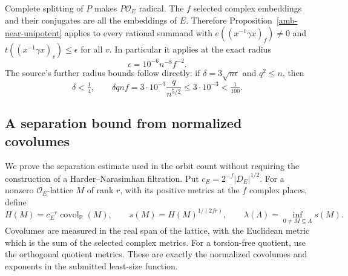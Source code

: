 Complete splitting of $P$ makes $P\mathcal O_E$ radical. The
$f$ selected complex embeddings and their conjugates are all the
embeddings of $E$. Therefore Proposition~\ref{amb-near-unipotent}
applies to every rational summand with
$e((x^{-1}\gamma x)_f)\ne0$ and
$t((x^{-1}\gamma x)_v)\le\epsilon$ for all $v$.
In particular it applies at the exact radius
\begin{equation}\label{amb-small-radius}
                  \epsilon=10^{-6}n^{-8}f^{-2}.
\end{equation}
The source's further radius bounds follow directly: if
$\delta=3\sqrt{n\epsilon}$ and $q^2\le n$, then
\[
             \delta<\tfrac14,
             \qquad\delta qnf
               =3\cdot10^{-3}\frac q{n^{5/2}}
               \le3\cdot10^{-3}<\tfrac1{100}.
\]

\subsection{A separation bound from normalized covolumes}

We prove the separation estimate used in the orbit count without
requiring the construction of a Harder--Narasimhan filtration.
Put $c_E=2^{-f}|D_E|^{1/2}$. For a nonzero
$\mathcal O_E$-lattice $M$ of rank $r$, with its positive metrics
at the $f$ complex places, define
\begin{equation}\label{amb-size}
 H(M)=c_E^{-r}\operatorname{covol}_{\mathbb R}(M),\qquad
 s(M)=H(M)^{1/(2fr)},\qquad
 \lambda(\Lambda)=\inf_{0\ne M\subseteq\Lambda}s(M).
\end{equation}
Covolumes are measured in the real span of the lattice, with the
Euclidean metric which is the sum of the selected complex metrics.
For a torsion-free quotient, use the orthogonal quotient metrics.
These are exactly the normalized covolumes and exponents in the
submitted least-size function.

